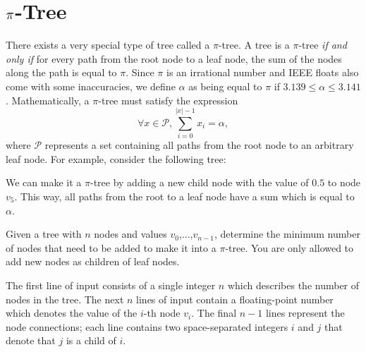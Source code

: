 \documentclass{contest-set}
\begin{document}
\section{$\mathlarger{\mathlarger{\mathlarger{\pi}}}$-Tree}
There exists a very special type of tree called a $\pi$-tree. A tree is a $\pi$-tree \textit{if and only if} for every path from the root node to a leaf node, the sum of the nodes along the path is equal to $\pi$. Since $\pi$ is an irrational number and IEEE floats also come with some inaccuracies, we define $\alpha$ as being equal to $\pi$ if $3.139 \leq \alpha \leq 3.141$. Mathematically, a $\pi$-tree must satisfy the expression
\begin{equation*}
    \forall x \in \mathcal{P}, \sum^{|x|-1}_{i=0} x_i=\alpha,
\end{equation*}
where $\mathcal{P}$ represents a set containing all paths from the root node to an arbitrary leaf node.
For example, consider the following tree:
\begin{figure}[h]
    \centering
\end{figure}

We can make it a $\pi$-tree by adding a new child node with the value of $0.5$ to node $v_5$. This way, all paths from the root to a leaf node have a sum which is equal to $\alpha$.

Given a tree with $n$ nodes and values $v_0$,$\ldots$,$v_{n-1}$, determine the minimum number of nodes that need to be added to make it into a $\pi$-tree. You are only allowed to add new nodes as children of leaf nodes.

The first line of input consists of a single integer $n$ which describes the number of nodes in the tree. The next $n$ lines of input contain a floating-point number which denotes the value of the $i$-th node $v_i$. The final $n-1$ lines represent the node connections; each line contains two space-separated integers $i$ and $j$ that denote that $j$ is a child of $i$.
\end{document}
